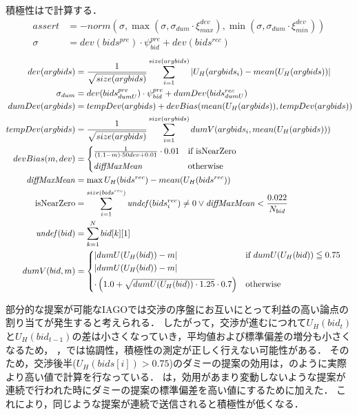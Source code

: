 積極性はで計算する．
\begin{align}
    assert &= -norm \left(\sigma, \max \left(\sigma, \sigma_{dum} \cdot \xi_{max}^{dev}\right), \min \left(\sigma, \sigma_{dum} \cdot \xi_{min}^{dev}\right) \right) \label{eq:assertiveness} \\
    \sigma &= dev(bids^{pre}) \cdot \psi_{\mathit{bid}}^{pre} + dev(bids^{rec}) \nonumber 
\end{align}
\begin{align}
    dev(argbids) &= \frac{1}{\sqrt{size(argbids)}}\sum_{i = 1}^{size(argbids)} |U_H(argbids_i) - mean(U_H(argbids))| \nonumber \\
    \sigma_{dum} &= dev(bids_{dumU}^{pre}) \cdot \psi_{\mathit{bid}}^{pre} + dumDev(bids_{dumU}^{rec}) \nonumber \\
    dumDev(argbids) &= tempDev(argbids) + devBias(mean(U_H(argbids)), tempDev(argbids)) \nonumber \\
    tempDev(argbids) &= \frac{1}{\sqrt{size(argbids)}}\sum_{i = 1}^{size(argbids)} dumV(argbids_i, mean(U_H(argbids))) \nonumber \\
    devBias(m, dev) &= 
    \begin{cases*}
        \frac{1}{(1.1 - m) \cdot 50dev + 0.01} \cdot 0.01 & if isNearZero \\
        \mathit{diffMaxMean} & otherwise 
    \end{cases*} \label{eq:devBias} \\
    \mathit{diffMaxMean} &= \max U_H(bids^{rec}) - mean(U_H(bids^{rec})) \nonumber \\
    {\rm isNearZero} &= \sum_{i = 1}^{size(bids^{rec})}\mathit{undef}(bids^{rec}_i) \neq 0 \vee \mathit{diffMaxMean} < \frac{0.022}{N_{bid}} \nonumber \\
    \mathit{undef}(bid) &= \sum_{k = 1}^{N} bid[k][1] \nonumber \\
    dumV(bid, m) &=
    \begin{cases*}
        |dumU(U_H(bid)) - m| & if $dumU(U_H(bid)) \leqq 0.75$ \\
        |dumU(U_H(bid)) - m| \\
        \cdot \left( 1.0 + \sqrt{dumU(U_H(bid)) \cdot 1.25} \cdot 0.7 \right) & otherwise 
    \end{cases*} \label{eq:dummyV}
\end{align}

部分的な提案が可能なIAGOでは交渉の序盤にお互いにとって利益の高い論点の割り当てが発生すると考えられる．
したがって，交渉が進むにつれて$U_H(bid_t)$と$U_H(bid_{t-1})$の差は小さくなっていき，平均値および標準偏差の増分も小さくなるため，
，では協調性，積極性の測定が正しく行えない可能性がある．
そのため，交渉後半($U_H(bids[i]) > 0.75$)のダミーの提案の効用は，のように実際より高い値で計算を行なっている．
は，効用があまり変動しないような提案が連続で行われた時にダミーの提案の標準偏差を高い値にするために加えた．
これにより，同じような提案が連続で送信されると積極性が低くなる．

